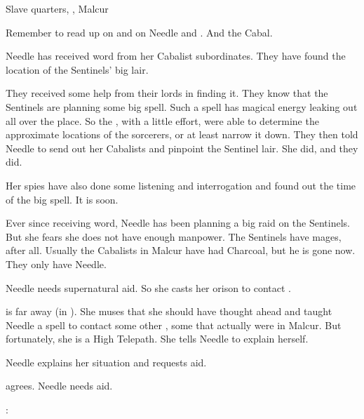 \stamp
  {\dateNeedleSummonsBanes}
  {Slave quarters, \CastlePelidor, Malcur}












Remember to read up on \banes{} and on Needle and \Achsah.
And the Cabal.



\begin{comment}
  \section{Needle contacts Achsah}
\end{comment}

Needle has received word from her Cabalist subordinates. 
They have found the location of the Sentinels' big lair. 

They received some help from their \resphan lords in finding it.
They know that the Sentinels are planning some big spell. 
Such a spell has magical energy leaking out all over the place. 
So the \resphain, with a little effort, were able to determine the approximate locations of the sorcerers, or at least narrow it down. 
They then told Needle to send out her Cabalists and pinpoint the Sentinel lair.
She did, and they did. 

Her spies have also done some listening and interrogation and found out the time of the big spell.
It is soon. 

Ever since receiving word, Needle has been planning a big raid on the Sentinels. 
But she fears she does not have enough manpower.
The Sentinels have mages, after all.
Usually the Cabalists in Malcur have had Charcoal, but he is gone now. 
They only have Needle.

Needle needs supernatural aid.
So she casts her orison to contact \Achsah. 

\Achsah is far away (in \Forclin).
She muses that she should have thought ahead and taught Needle a spell to contact some other \resphain, some that actually were in Malcur. 
But fortunately, she is a High Telepath. 
She tells Needle to explain herself.

Needle explains her situation and requests aid. 

\Achsah agrees.
Needle needs aid.

\Achsah: 








